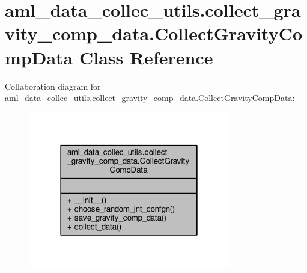 \hypertarget{classaml__data__collec__utils_1_1collect__gravity__comp__data_1_1_collect_gravity_comp_data}{\section{aml\-\_\-data\-\_\-collec\-\_\-utils.\-collect\-\_\-gravity\-\_\-comp\-\_\-data.\-Collect\-Gravity\-Comp\-Data Class Reference}
\label{classaml__data__collec__utils_1_1collect__gravity__comp__data_1_1_collect_gravity_comp_data}
}


Collaboration diagram for aml\-\_\-data\-\_\-collec\-\_\-utils.\-collect\-\_\-gravity\-\_\-comp\-\_\-data.\-Collect\-Gravity\-Comp\-Data\-:
\nopagebreak
\begin{figure}[H]
\begin{center}
\leavevmode
\includegraphics[width=250pt]{classaml__data__collec__utils_1_1collect__gravity__comp__data_1_1_collect_gravity_comp_data__coll__graph}
\end{center}
\end{figure}
